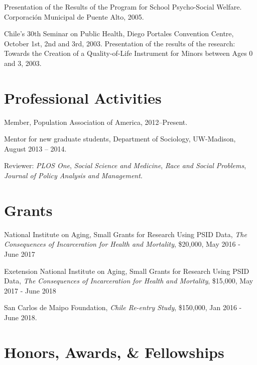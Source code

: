 \documentclass[10pt,letterpaper]{article}
\renewenvironment{itemize}{
  \begin{list}{}{
    \setlength{\leftmargin}{1.5em}
    \setlength{\itemsep}{0.25em}
    \setlength{\parskip}{0pt}
    \setlength{\parsep}{0.25em}
  }
}{
  \end{list}
}
\begin{document}
\begin{itemize}
\item Presentation of the Results of the Program for School Psycho-Social Welfare. Corporación Municipal de Puente Alto, 2005.

\item Chile’s 30th Seminar on Public Health, Diego Portales Convention Centre, October 1st, 2nd and 3rd, 2003. Presentation of the results of the research: Towards the Creation of a Quality-of-Life Instrument for Minors between Ages 0 and 3, 2003.

\end{itemize}

\section*{Professional Activities}

\begin{itemize}
\item Member, Population Association of America, 2012--Present.
\item Mentor for new graduate students, Department of Sociology, UW-Madison,
August 2013 – 2014.
\item Reviewer: \textit{PLOS One}, \textit{Social Science and Medicine}, \textit{Race and Social Problems}, \textit{Journal of Policy Analysis and Management}.
\end{itemize}

\section*{Grants}

\begin{itemize}
\item National Institute on Aging, Small Grants for Research Using PSID Data, \textit{The Consequences of Incarceration for Health and Mortality},  \$20,000, May 2016 - June 2017
\item Exetension National Institute on Aging, Small Grants for Research Using PSID Data, \textit{The Consequences of Incarceration for Health and Mortality},  \$15,000, May 2017 - June 2018
\item San Carlos de Maipo Foundation, \textit{Chile Re-entry Study}, \$150,000, Jan 2016 - June 2018.
\end{itemize}


\section*{Honors, Awards, \& Fellowships}
\end{document}
